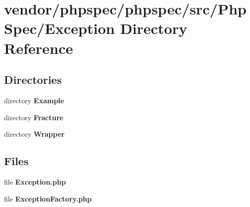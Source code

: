 \section{vendor/phpspec/phpspec/src/\+Php\+Spec/\+Exception Directory Reference}
\label{dir_b7df8a8b3d885e666092cd79e533f870}
\subsection*{Directories}
\begin{DoxyCompactItemize}
\item 
directory {\bf Example}
\item 
directory {\bf Fracture}
\item 
directory {\bf Wrapper}
\end{DoxyCompactItemize}
\subsection*{Files}
\begin{DoxyCompactItemize}
\item 
file {\bf Exception.\+php}
\item 
file {\bf Exception\+Factory.\+php}
\end{DoxyCompactItemize}
